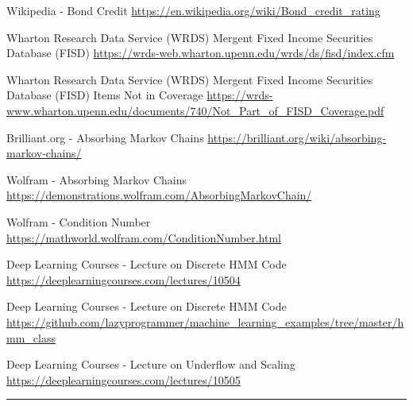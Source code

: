 \documentclass[a4paper, 11pt]{article}
\begin{document}
\begin{thebibliography}{9}
	
	Wikipedia - Bond Credit \url{https://en.wikipedia.org/wiki/Bond_credit_rating}
	
	Wharton Research Data Service (WRDS) Mergent Fixed Income Securities Database (FISD) \url{https://wrds-web.wharton.upenn.edu/wrds/ds/fisd/index.cfm}
	
	Wharton Research Data Service (WRDS) Mergent Fixed Income Securities Database (FISD) Items Not in Coverage \url{https://wrds-www.wharton.upenn.edu/documents/740/Not_Part_of_FISD_Coverage.pdf}	
	
	Brilliant.org - Absorbing Markov Chains \url{https://brilliant.org/wiki/absorbing-markov-chains/}

	Wolfram - Absorbing Markov Chains \url{https://demonstrations.wolfram.com/AbsorbingMarkovChain/}	
	
	Wolfram - Condition Number \url{https://mathworld.wolfram.com/ConditionNumber.html}	
	
	Deep Learning Courses - Lecture on Discrete HMM Code \url{https://deeplearningcourses.com/lectures/10504}	
	
	Deep Learning Courses - Lecture on Discrete HMM Code \url{https://github.com/lazyprogrammer/machine_learning_examples/tree/master/hmm_class}	
	
	Deep Learning Courses - Lecture on Underflow and Scaling \url{https://deeplearningcourses.com/lectures/10505}		
\end{thebibliography}	

\noindent\rule{7in}{2.8pt}
\end{document}
